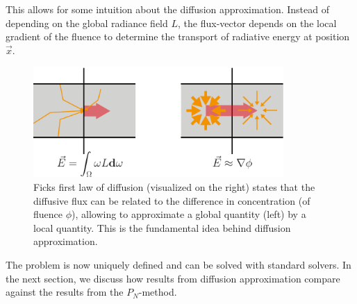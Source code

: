 This allows for some intuition about the diffusion approximation. Instead of depending on the global radiance field $L$, the flux-vector depends on the local gradient of the fluence to determine the transport of radiative energy at position $\vec{x}$.
\begin{figure}[h]
\centering
\includegraphics[width=0.85\textwidth]{05_diffusion_approximation/figures/fig_diffusion_idea.pdf}
\caption{Ficks first law of diffusion (visualized on the right) states that the diffusive flux can be related to the difference in concentration (of fluence $\phi$), allowing to approximate a global quantity (left) by a local quantity. This is the fundamental idea behind diffusion approximation.}
\label{fig:da_moment_problem_flux_as_fluence_gradient}
\end{figure}
The problem is now uniquely defined and can be solved with standard solvers. In the next section, we discuss how results from diffusion approximation compare against the results from the $P_N$-method.
